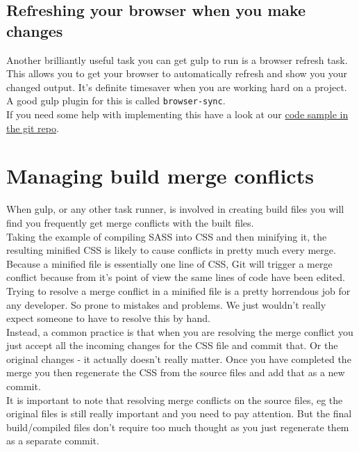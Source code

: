 \subsection{Refreshing your browser when you make changes}

Another brilliantly useful task you can get gulp to run is a browser refresh task.
\\

This allows you to get your browser to automatically refresh and show you your changed output. It's definite timesaver when you are working hard on a project.
\\ 

A good gulp plugin for this is called \texttt{browser-sync}.
\\

If you need some help with implementing this have a look at our \href{https://gist.github.com/oliward/426a6a89bda3d55c614b495431290ba4}{code sample in the git repo}.


\section{Managing build merge conflicts}

When gulp, or any other task runner, is involved in creating build files you will find you frequently get merge conflicts with the built files.
\\

Taking the example of compiling SASS into CSS and then minifying it, the resulting minified CSS is likely to cause conflicts in pretty much every merge. Because a minified file is essentially one line of CSS, Git will trigger a merge conflict because from it's point of view the same lines of code have been edited.
\\

Trying to resolve a merge conflict in a minified file is a pretty horrendous job for any developer. So prone to mistakes and problems. We just wouldn't really expect someone to have to resolve this by hand.
\\

Instead, a common practice is that when you are resolving the merge conflict you just accept all the incoming changes for the CSS file and commit that. Or the original changes - it actually doesn't really matter. Once you have completed the merge you then regenerate the CSS from the source files and add that as a new commit.
\\

It is important to note that resolving merge conflicts on the source files, eg the original files is still really important and you need to pay attention. But the final build/compiled files don't require too much thought as you just regenerate them as a separate commit.
\\

